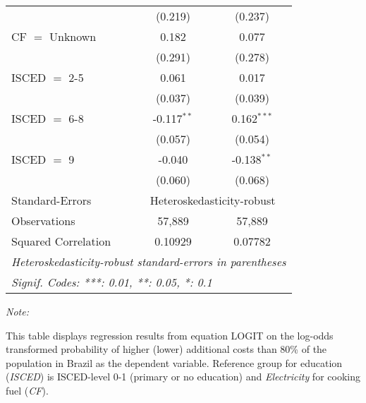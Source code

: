 \begin{table}[htbp!]
\begin{adjustbox}{width = 1\textwidth, max height = 0.95\textheight, center}
\begin{threeparttable}[b]
\begin{tabular}{lcc}
                                 & (0.219)        & (0.237)\\   
            CF $=$ Unknown       & 0.182          & 0.077\\   
                                 & (0.291)        & (0.278)\\   
            ISCED $=$ 2-5        & 0.061          & 0.017\\   
                                 & (0.037)        & (0.039)\\   
            ISCED $=$ 6-8        & -0.117$^{**}$  & 0.162$^{***}$\\   
                                 & (0.057)        & (0.054)\\   
            ISCED $=$ 9          & -0.040         & -0.138$^{**}$\\   
                                 & (0.060)        & (0.068)\\   
            \midrule 
            Standard-Errors & \multicolumn{2}{c}{Heteroskedasticity-robust} \\ 
            Observations         & 57,889         & 57,889\\  
            Squared Correlation  & 0.10929        & 0.07782\\  
            \midrule \midrule
            \multicolumn{3}{l}{\emph{Heteroskedasticity-robust standard-errors in parentheses}}\\
            \multicolumn{3}{l}{\emph{Signif. Codes: ***: 0.01, **: 0.05, *: 0.1}}\\
         \end{tabular}
         
         \begin{tablenotes}\item \medskip \textit{Note:}
            \item This table displays regression results from equation LOGIT on the log-odds transformed probability of higher (lower) additional costs than 80\% of the population in Brazil as the dependent variable. Reference group for education (\textit{ISCED}) is ISCED-level 0-1 (primary or no education) and \textit{Electricity} for cooking fuel (\textit{CF}).
         \end{tablenotes}
      \end{threeparttable}
   \end{adjustbox}
\end{table}


